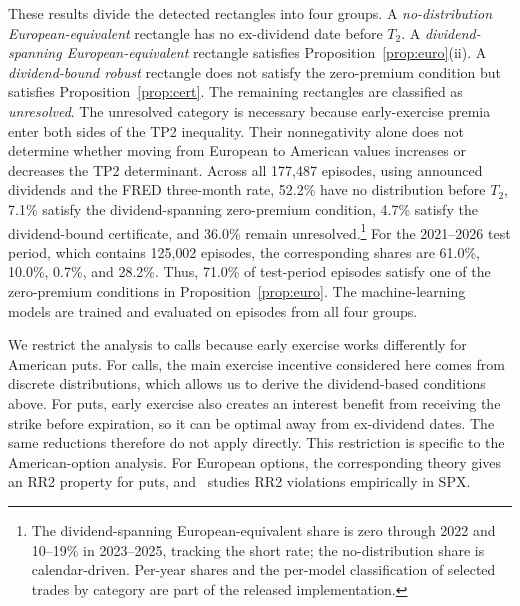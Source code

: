 \documentclass[sigconf,review,anonymous]{acmart}
\begin{document}
These results divide the detected rectangles into four groups. A \emph{no-distribution European-equivalent} rectangle has no ex-dividend date before $T_2$. A \emph{dividend-spanning European-equivalent} rectangle satisfies Proposition~\ref{prop:euro}(ii). A \emph{dividend-bound robust} rectangle does not satisfy the zero-premium condition but satisfies Proposition~\ref{prop:cert}. The remaining rectangles are classified as \emph{unresolved}. The unresolved category is necessary because early-exercise premia enter both sides of the TP2 inequality. Their nonnegativity alone does not determine whether moving from European to American values increases or decreases the TP2 determinant.
Across all 177{,}487 episodes, using announced dividends and the FRED three-month rate, 52.2\% have no distribution before $T_2$, 7.1\% satisfy the dividend-spanning zero-premium condition, 4.7\% satisfy the dividend-bound certificate, and 36.0\% remain unresolved.\footnote{The dividend-spanning European-equivalent share is zero through 2022 and 10--19\% in 2023--2025, tracking the short rate; the no-distribution share is calendar-driven. Per-year shares and the per-model classification of selected trades by category are part of the released implementation.} For the 2021--2026 test period, which contains 125{,}002 episodes, the corresponding shares are 61.0\%, 10.0\%, 0.7\%, and 28.2\%. Thus, 71.0\% of test-period episodes satisfy one of the zero-premium conditions in Proposition~\ref{prop:euro}. The machine-learning models are trained and evaluated on episodes from all four groups.

We restrict the analysis to calls because early exercise works differently for American puts. For calls, the main exercise incentive considered here comes from discrete distributions, which allows us to derive the dividend-based conditions above. For puts, early exercise also creates an interest benefit from receiving the strike before expiration, so it can be optimal away from ex-dividend dates. The same reductions therefore do not apply directly. This restriction is specific to the American-option analysis. For European options, the corresponding theory gives an RR2 property for puts, and~\cite{glasserman2025tp2} studies RR2 violations empirically in SPX.
\end{document}

